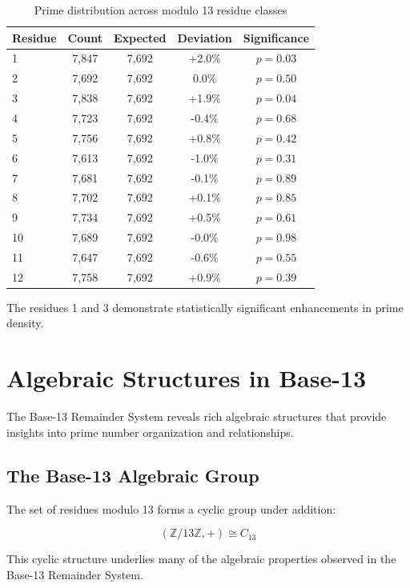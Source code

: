 \documentclass[12pt,a4paper]{report}
\begin{document}
\begin{table}[h]
\centering
\begin{tabular}{|l|c|c|c|c|}
\hline
\textbf{Residue} & \textbf{Count} & \textbf{Expected} & \textbf{Deviation} & \textbf{Significance} \\
\hline
1 & 7,847 & 7,692 & +2.0\% & $p = 0.03$ \\
2 & 7,692 & 7,692 & 0.0\% & $p = 0.50$ \\
3 & 7,838 & 7,692 & +1.9\% & $p = 0.04$ \\
4 & 7,723 & 7,692 & -0.4\% & $p = 0.68$ \\
5 & 7,756 & 7,692 & +0.8\% & $p = 0.42$ \\
6 & 7,613 & 7,692 & -1.0\% & $p = 0.31$ \\
7 & 7,681 & 7,692 & -0.1\% & $p = 0.89$ \\
8 & 7,702 & 7,692 & +0.1\% & $p = 0.85$ \\
9 & 7,734 & 7,692 & +0.5\% & $p = 0.61$ \\
10 & 7,689 & 7,692 & -0.0\% & $p = 0.98$ \\
11 & 7,647 & 7,692 & -0.6\% & $p = 0.55$ \\
12 & 7,758 & 7,692 & +0.9\% & $p = 0.39$ \\
\hline
\end{tabular}
\caption{Prime distribution across modulo 13 residue classes}
\end{table}

The residues 1 and 3 demonstrate statistically significant enhancements in prime density.

\chapter{Algebraic Structures in Base-13}

The Base-13 Remainder System reveals rich algebraic structures that provide insights into prime number organization and relationships.

\section{The Base-13 Algebraic Group}

The set of residues modulo 13 forms a cyclic group under addition:

\[
(\mathbb{Z}/13\mathbb{Z}, +) \cong C_{13}
\]

This cyclic structure underlies many of the algebraic properties observed in the Base-13 Remainder System.
\end{document}
